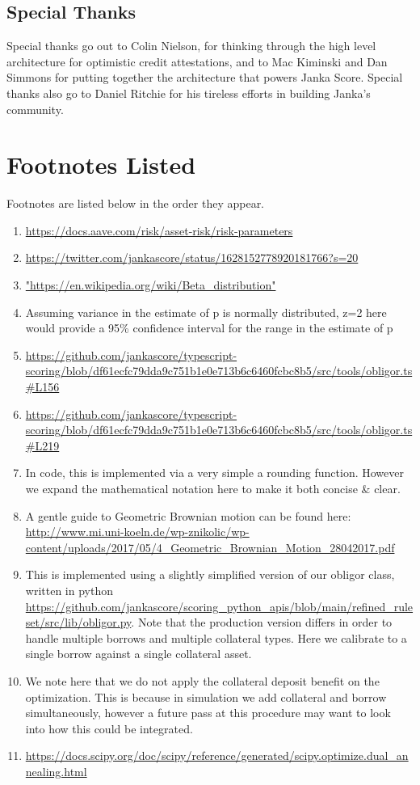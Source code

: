 \documentclass{article}
\begin{document}
\subsection{Special Thanks}
Special thanks go out to Colin Nielson, for thinking through the high level architecture for optimistic credit attestations, and to Mac Kiminski and Dan Simmons for putting together the architecture that powers Janka Score. Special thanks also go to Daniel Ritchie for his tireless efforts in building Janka's community.

\section{Footnotes Listed}
Footnotes are listed below in the order they appear.
\begin{enumerate}
\item \url{https://docs.aave.com/risk/asset-risk/risk-parameters}
\item \url{https://twitter.com/jankascore/status/1628152778920181766?s=20}
\item \url{"https://en.wikipedia.org/wiki/Beta\_distribution"}
\item Assuming variance in the estimate of p is normally distributed, z=2 here would provide a 95\% confidence interval for the range in the estimate of p
\item \url{https://github.com/jankascore/typescript-scoring/blob/df61ecfc79dda9c751b1e0e713b6c6460fcbc8b5/src/tools/obligor.ts\#L156}
\item \url{https://github.com/jankascore/typescript-scoring/blob/df61ecfc79dda9c751b1e0e713b6c6460fcbc8b5/src/tools/obligor.ts\#L219}
\item In code, this is implemented via a very simple a rounding function. However we expand the mathematical notation here to make it both concise \& clear.
\item A gentle guide to Geometric Brownian motion can be found here: \url{http://www.mi.uni-koeln.de/wp-znikolic/wp-content/uploads/2017/05/4\_Geometric\_Brownian\_Motion\_28042017.pdf}
\item This is implemented using a slightly simplified version of our obligor class, written in python \url{https://github.com/jankascore/scoring\_python\_apis/blob/main/refined\_ruleset/src/lib/obligor.py}. Note that the production version differs in order to handle multiple borrows and multiple collateral types. Here we calibrate to a single borrow against a single collateral asset.
\item We note here that we do not apply the collateral deposit benefit on the optimization. This is because in simulation we add collateral and borrow simultaneously, however a future pass at this procedure may want to look into how this could be integrated.
\item \url{https://docs.scipy.org/doc/scipy/reference/generated/scipy.optimize.dual\_annealing.html}
\end{enumerate}
\end{document}
